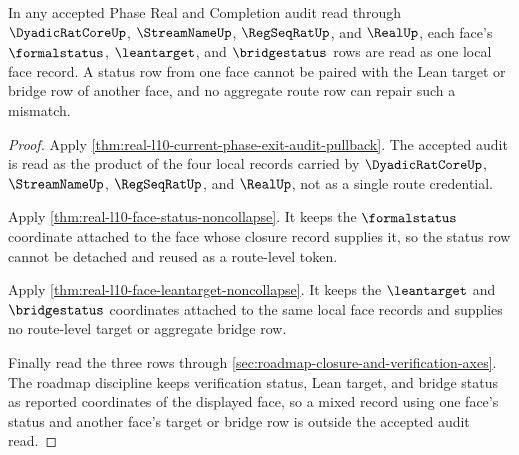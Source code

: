 \begin{theorem}
\label{thm:real-l10-face-status-target-pairing}
In any accepted Phase Real and Completion audit read through
$\DyadicRatCoreUp$, $\StreamNameUp$, $\RegSeqRatUp$, and $\RealUp$, each face's
$\formalstatus$, $\leantarget$, and $\bridgestatus$ rows are read as one local
face record. A status row from one face cannot be paired with the Lean target
or bridge row of another face, and no aggregate route row can repair such a
mismatch.
\end{theorem}
\begin{proof}
Apply \autoref{thm:real-l10-current-phase-exit-audit-pullback}. The accepted
audit is read as the product of the four local records carried by
$\DyadicRatCoreUp$, $\StreamNameUp$, $\RegSeqRatUp$, and $\RealUp$, not as a
single route credential.

Apply \autoref{thm:real-l10-face-status-noncollapse}. It keeps the
$\formalstatus$ coordinate attached to the face whose closure record supplies
it, so the status row cannot be detached and reused as a route-level token.

Apply \autoref{thm:real-l10-face-leantarget-noncollapse}. It keeps the
$\leantarget$ and $\bridgestatus$ coordinates attached to the same local face
records and supplies no route-level target or aggregate bridge row.

Finally read the three rows through
\autoref{sec:roadmap-closure-and-verification-axes}. The roadmap discipline
keeps verification status, Lean target, and bridge status as reported
coordinates of the displayed face, so a mixed record using one face's status
and another face's target or bridge row is outside the accepted audit read.
\end{proof}

